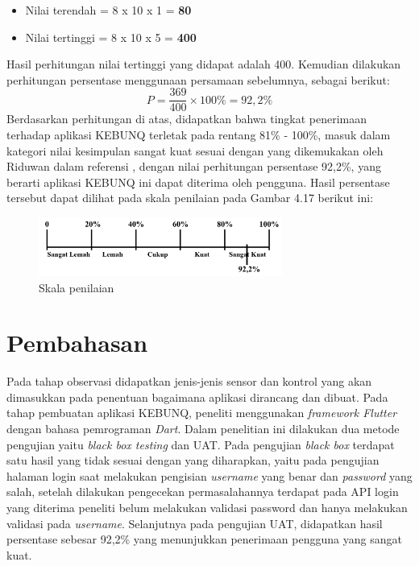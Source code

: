 \begin{flushleft}
\begin{justify}
\begin{itemize}
                \item Nilai terendah = 8 x 10 x 1 = \textbf{80}
                \item Nilai tertinggi = 8 x 10 x 5 = \textbf{400}
             \end{itemize}
             Hasil perhitungan nilai tertinggi yang didapat adalah 400. Kemudian dilakukan perhitungan persentase menggunaan persamaan sebelumnya, sebagai berikut:
             \begin{equation}
                P = \frac{369}{400} \times 100\% = 92,2\%
             \end{equation}
             Berdasarkan perhitungan di atas, didapatkan bahwa tingkat penerimaan terhadap aplikasi KEBUNQ terletak pada rentang 81\% - 100\%, 
             masuk dalam kategori nilai kesimpulan sangat kuat sesuai dengan yang dikemukakan oleh Riduwan dalam referensi \cite{kuantitatif}, dengan nilai perhitungan persentase
             92,2\%, yang berarti aplikasi KEBUNQ ini dapat diterima oleh pengguna. Hasil persentase tersebut dapat dilihat pada skala penilaian pada Gambar 4.17 berikut ini:
             \begin{figure}[ht]
                \centering
                \includegraphics[width=8cm]{images/bab 4/persentase.png}
                \caption{Skala penilaian}
            \end{figure}


   
        \section{Pembahasan}
        Pada tahap observasi didapatkan jenis-jenis sensor dan kontrol yang akan dimasukkan pada penentuan bagaimana aplikasi dirancang dan dibuat. Pada tahap pembuatan aplikasi KEBUNQ, peneliti menggunakan \emph{framework Flutter} dengan bahasa pemrograman \emph{Dart}. Dalam penelitian ini dilakukan dua metode pengujian yaitu \emph{black box testing} dan UAT. Pada pengujian \emph{black box} terdapat satu hasil yang tidak sesuai dengan yang diharapkan, yaitu pada
        pengujian halaman login saat melakukan pengisian \emph{username} yang benar dan \emph{password} yang salah, setelah dilakukan pengecekan permasalahannya terdapat pada API login yang diterima peneliti 
        belum melakukan validasi password dan hanya melakukan validasi pada \emph{username}. Selanjutnya pada pengujian UAT, didapatkan hasil persentase sebesar 92,2\% yang menunjukkan penerimaan pengguna yang sangat kuat.
         


\end{justify}
\end{flushleft}
